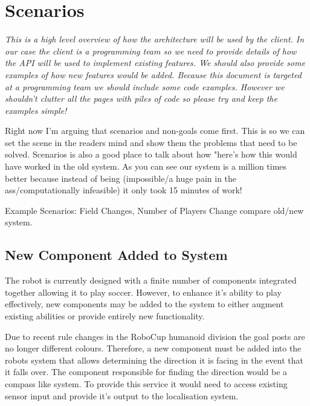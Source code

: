 \documentclass[english,12pt]{scrartcl}
\begin{document}
    \section{Scenarios}
        {\em %
        This is a high level overview of how the architecture will be used by the client. In our
        case the client is a programming team so we need to provide details of how the API will be
        used to implement existing features. We should also provide some examples of how new 
        features would be added. Because this document is targeted at a programming team we should
        include some code examples. However we shouldn't clutter all the pages with piles of code so 
        please try and keep the examples simple!

        Right now I'm arguing that scenarios and non-goals come first. This is so we can set the
        scene in the readers mind and show them the problems that need to be solved. Scenarios is
        also a good place to talk about how "here's how this would have worked in the old system. As
        you can see our system is a million times better because instead of being (impossible/a huge 
        pain in the ass/computationally infeasible) it only took 15 minutes of work!
        
        Example Scenarios: Field Changes, Number of Players Change compare old/new system.
        }
        
        \subsection{New Component Added to System}
            The robot is currently designed with a finite number of components integrated together
            allowing it to play soccer. However, to enhance it's ability to play effectively, new
            components may be added to the system to either augment existing abilities or provide
            entirely new functionality.
            
            Due to recent rule changes in the RoboCup humanoid division
            \cite[Section 1.2]{humanoid2013rules} the goal posts are no longer different colours.
            Therefore, a new component must be added into the robots system that allows determining 
            the direction it is facing in the event that it falls over. The component responsible
            for finding the direction would be a compass like system. To provide this service it
            would need to access existing sensor input and provide it's output to the localisation
            system.
    
\end{document}
